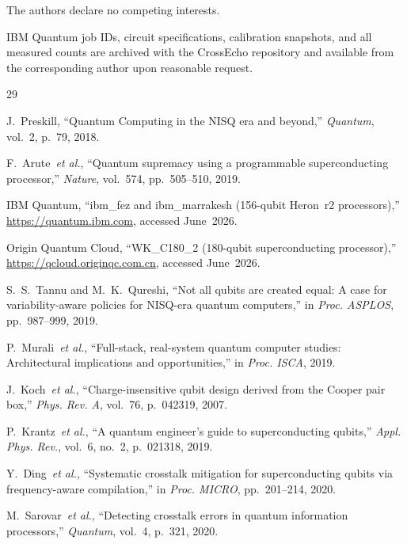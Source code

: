 \documentclass[ASNA,twocolumn]{USG}
\begin{document}
The authors declare no competing interests.

IBM Quantum job IDs, circuit specifications, calibration snapshots, and all measured counts are archived with the CrossEcho repository and available from the corresponding author upon reasonable request. 

\begin{thebibliography}{29}

J.~Preskill, ``Quantum Computing in the NISQ era and beyond,'' \emph{Quantum}, vol.~2, p.~79, 2018.

F.~Arute~\emph{et al.}, ``Quantum supremacy using a programmable superconducting processor,'' \emph{Nature}, vol.~574, pp.~505--510, 2019.

IBM Quantum, ``ibm\_fez and ibm\_marrakesh (156-qubit Heron~r2 processors),'' \url{https://quantum.ibm.com}, accessed June~2026.

Origin Quantum Cloud, ``WK\_C180\_2 (180-qubit superconducting processor),'' \url{https://qcloud.originqc.com.cn}, accessed June~2026.

S.~S.~Tannu and M.~K.~Qureshi, ``Not all qubits are created equal: A case for variability-aware policies for NISQ-era quantum computers,'' in \emph{Proc. ASPLOS}, pp.~987--999, 2019.

P.~Murali~\emph{et al.}, ``Full-stack, real-system quantum computer studies: Architectural implications and opportunities,'' in \emph{Proc. ISCA}, 2019.

J.~Koch~\emph{et al.}, ``Charge-insensitive qubit design derived from the Cooper pair box,'' \emph{Phys. Rev. A}, vol.~76, p.~042319, 2007.

P.~Krantz~\emph{et al.}, ``A quantum engineer's guide to superconducting qubits,'' \emph{Appl. Phys. Rev.}, vol.~6, no.~2, p.~021318, 2019.

Y.~Ding~\emph{et al.}, ``Systematic crosstalk mitigation for superconducting qubits via frequency-aware compilation,'' in \emph{Proc. MICRO}, pp.~201--214, 2020.

M.~Sarovar~\emph{et al.}, ``Detecting crosstalk errors in quantum information processors,'' \emph{Quantum}, vol.~4, p.~321, 2020.


\end{thebibliography}
\end{document}

